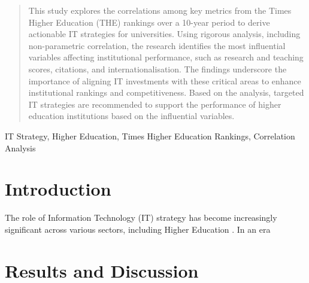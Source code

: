 \documentclass[conference]{IEEEtran}
\begin{document}
\newcommand{\al}[1]{{\textbf{\color{blue} Al: #1}}}

\maketitle

\begin{abstract}
	This study explores the correlations among key metrics from the Times Higher Education (THE) rankings over a 10-year period to derive actionable IT strategies for universities. Using rigorous analysis, including non-parametric correlation, the research identifies the most influential variables affecting institutional performance, such as research and teaching scores, citations, and internationalisation. The findings underscore the importance of aligning IT investments with these critical areas to enhance institutional rankings and competitiveness. Based on the analysis, targeted IT strategies are recommended to support the performance of higher education institutions based on the influential variables.
\end{abstract}

\begin{IEEEkeywords}
	IT Strategy, Higher Education, Times Higher Education Rankings, Correlation Analysis
\end{IEEEkeywords}


\section{Introduction}


The role of Information Technology (IT) strategy has become increasingly significant across various sectors, including Higher Education \cite{hashim2021higher}. In an era 


\section{Results and Discussion}
\end{document}
